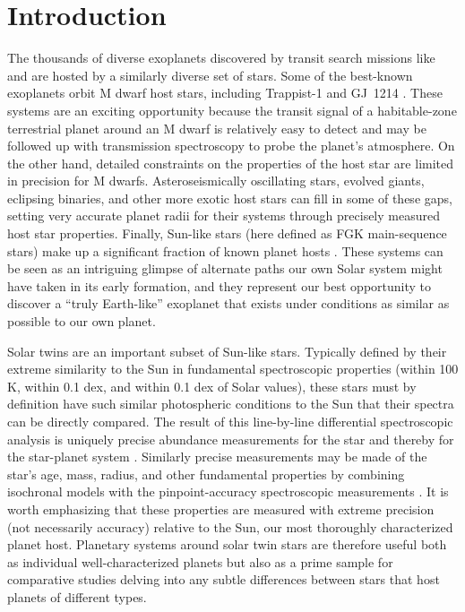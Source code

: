 \documentclass[modern]{aastex62}
\begin{document}
\section{Introduction}
\label{s:intro}

The thousands of diverse exoplanets discovered by transit search missions like \TESS and \kepler are hosted by a similarly diverse set of stars. 
Some of the best-known exoplanets orbit M dwarf host stars, including Trappist-1 \citep{} and GJ~1214 \citep{}. 
These systems are an exciting opportunity because the transit signal of a habitable-zone terrestrial planet around an M dwarf is relatively easy to detect and may be followed up with transmission spectroscopy to probe the planet's atmosphere. 
On the other hand, detailed constraints on the properties of the host star are limited in precision for M dwarfs. 
Asteroseismically oscillating stars, evolved giants, eclipsing binaries, and other more exotic host stars can fill in some of these gaps, setting very accurate planet radii for their systems through precisely measured host star properties. 
Finally, Sun-like stars (here defined as FGK main-sequence stars) make up a significant fraction of known planet hosts . 
These systems can be seen as an intriguing glimpse of alternate paths our own Solar system might have taken in its early formation, and they represent our best opportunity to discover a ``truly Earth-like'' exoplanet that exists under conditions as similar as possible to our own planet.

Solar twins are an important subset of Sun-like stars. 
Typically defined by their extreme similarity to the Sun in fundamental spectroscopic properties (\teff within 100 K, \logg within 0.1 dex, and \feh within 0.1 dex of Solar values), these stars must by definition have such similar photospheric conditions to the Sun that their spectra can be directly compared. 
The result of this line-by-line differential spectroscopic analysis is uniquely precise abundance measurements for the star and thereby for the star-planet system \citep[see e.g.][who achieve 0.01 dex or 2\% precision on abundance measurements for over 30 elements]{Bedell18, Spina18}. 
Similarly precise measurements may be made of the star's age, mass, radius, and other fundamental properties by combining isochronal models with the pinpoint-accuracy spectroscopic measurements \citep{}. 
It is worth emphasizing that these properties are measured with extreme precision (not necessarily accuracy) relative to the Sun, our most thoroughly characterized planet host. 
Planetary systems around solar twin stars are therefore useful both as individual well-characterized planets but also as a prime sample for comparative studies delving into any subtle differences between stars that host planets of different types.
\end{document}
